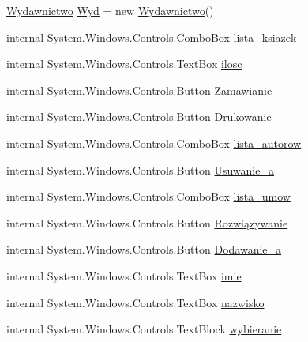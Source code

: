 \begin{DoxyCompactItemize}
\item 
\mbox{\hyperlink{class_projekt1_1_1_wydawnictwo}{Wydawnictwo}} \mbox{\hyperlink{class_projekt1_1_1_main_window_a3bdf5697cd74ad55fe1309996783f642}{Wyd}} = new \mbox{\hyperlink{class_projekt1_1_1_wydawnictwo}{Wydawnictwo}}()
\item 
internal System.\+Windows.\+Controls.\+Combo\+Box \mbox{\hyperlink{class_projekt1_1_1_main_window_aa8adc5a603b742e82579d8062c976aed}{lista\+\_\+ksiazek}}
\item 
internal System.\+Windows.\+Controls.\+Text\+Box \mbox{\hyperlink{class_projekt1_1_1_main_window_a0e2300e3d906ee24070c8f87266b9210}{ilosc}}
\item 
internal System.\+Windows.\+Controls.\+Button \mbox{\hyperlink{class_projekt1_1_1_main_window_ad1ebff02a9f776ed0dc0b589e20c4f44}{Zamawianie}}
\item 
internal System.\+Windows.\+Controls.\+Button \mbox{\hyperlink{class_projekt1_1_1_main_window_a1c042aa8e34b76d530620deaa8905d31}{Drukowanie}}
\item 
internal System.\+Windows.\+Controls.\+Combo\+Box \mbox{\hyperlink{class_projekt1_1_1_main_window_ad059c62457d900019cc034099f6f6897}{lista\+\_\+autorow}}
\item 
internal System.\+Windows.\+Controls.\+Button \mbox{\hyperlink{class_projekt1_1_1_main_window_aa3e96f6f9b88290e73a30e52ea302c15}{Usuwanie\+\_\+a}}
\item 
internal System.\+Windows.\+Controls.\+Combo\+Box \mbox{\hyperlink{class_projekt1_1_1_main_window_a0fda033c03ec375052aca28f75d2e24f}{lista\+\_\+umow}}
\item 
internal System.\+Windows.\+Controls.\+Button \mbox{\hyperlink{class_projekt1_1_1_main_window_a2fc1dfbf4635d867541b084690cb0829}{Rozwiązywanie}}
\item 
internal System.\+Windows.\+Controls.\+Button \mbox{\hyperlink{class_projekt1_1_1_main_window_a602f8b13ad11a342e0bb0b4c666eb26d}{Dodawanie\+\_\+a}}
\item 
internal System.\+Windows.\+Controls.\+Text\+Box \mbox{\hyperlink{class_projekt1_1_1_main_window_af5be3437110c7beb7f9a96f15bb3d951}{imie}}
\item 
internal System.\+Windows.\+Controls.\+Text\+Box \mbox{\hyperlink{class_projekt1_1_1_main_window_a7cd5f7d50fa2313a0cbeea6c5caf5337}{nazwisko}}
\item 
internal System.\+Windows.\+Controls.\+Text\+Block \mbox{\hyperlink{class_projekt1_1_1_main_window_a563373b62c48bb9b6f7a57a3e395046d}{wybieranie}}

\end{DoxyCompactItemize}

